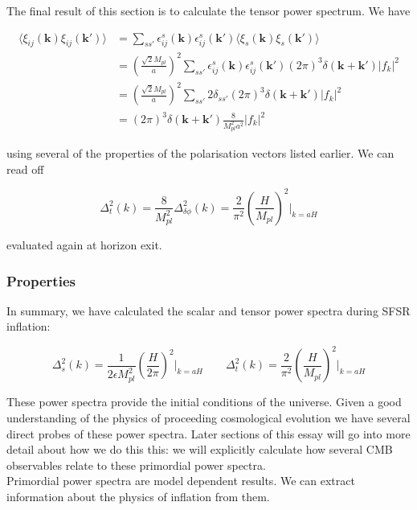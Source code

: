 \documentclass[a4paper,10pt]{article}
\renewcommand{\v}[1]{\mathbf{#1}}
\newcommand{\Mp}{M_{pl}}
\begin{document}
The final result of this section is to calculate the tensor power spectrum. We have

\begin{equation}\begin{split}
\langle\xi_{ij}(\v{k})\xi_{ij}(\v{k'})\rangle & = \sum_{ss'} \epsilon^s_{ij}(\v{k})\epsilon^s_{ij}(\v{k'})\langle\xi_{s}(\v{k})\xi_{s}(\v{k'})\rangle\\
&= (\frac{\sqrt{2}\Mp}{a})^2 \sum_{ss'} \epsilon^s_{ij}(\v{k})\epsilon^s_{ij}(\v{k'})(2\pi)^3\delta(\v{k}+\v{k'})|f_k|^2\\
&= (\frac{\sqrt{2}\Mp}{a})^2 \sum_{ss'} 2\delta_{ss'}(2\pi)^3\delta(\v{k}+\v{k'})|f_k|^2\\
&= (2\pi)^3\delta(\v{k}+\v{k'})\frac{8}{\Mp^2a^2}|f_k|^2
\end{split}\end{equation}

using several of the properties of the polarisation vectors listed earlier. We can read off 

\begin{equation}
\Delta^2_t(k)=\frac{8}{\Mp^2}\Delta^2_{\delta\phi}(k) = \frac{2}{\pi^2}(\frac{H}{\Mp})^2 \rvert_{k=aH}
\end{equation}

evaluated again at horizon exit.
\subsubsection{Properties}

In summary, we have calculated the scalar and tensor power spectra during SFSR inflation:

\begin{equation}
\Delta^2_{s}(k) = \frac{1}{2\epsilon\Mp^2}(\frac{H}{2\pi})^2\rvert_{k=aH} \qquad
\Delta^2_t(k)= \frac{2}{\pi^2}(\frac{H}{\Mp})^2\rvert_{k=aH}
\end{equation}

These power spectra provide the initial conditions of the universe. Given a good understanding of the physics of proceeding cosmological evolution we have several direct probes of these power spectra. Later sections of this essay will go into more detail about how we do this this: we will explicitly calculate how several CMB observables relate to these primordial power spectra.\\

Primordial power spectra are model dependent results. We can extract information about the physics of inflation from them. \\
\end{document}
